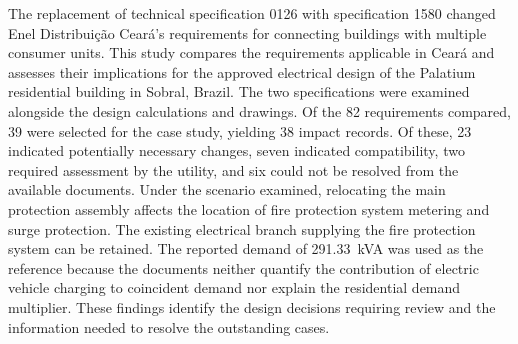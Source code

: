 The replacement of technical specification 0126 with specification 1580 changed Enel Distribuição Ceará's requirements for connecting buildings with multiple consumer units. This study compares the requirements applicable in Ceará and assesses their implications for the approved electrical design of the Palatium residential building in Sobral, Brazil. The two specifications were examined alongside the design calculations and drawings. Of the 82 requirements compared, 39 were selected for the case study, yielding 38 impact records. Of these, 23 indicated potentially necessary changes, seven indicated compatibility, two required assessment by the utility, and six could not be resolved from the available documents. Under the scenario examined, relocating the main protection assembly affects the location of fire protection system metering and surge protection. The existing electrical branch supplying the fire protection system can be retained. The reported demand of 291.33~kVA was used as the reference because the documents neither quantify the contribution of electric vehicle charging to coincident demand nor explain the residential demand multiplier. These findings identify the design decisions requiring review and the information needed to resolve the outstanding cases.

